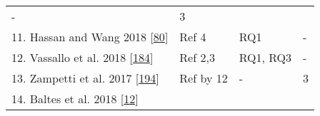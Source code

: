 \documentclass[]{book}
\begin{document}
\begin{longtable}[]{@{}llll@{}}
\begin{minipage}[t]{0.14\columnwidth}
-\strut
\end{minipage} & \begin{minipage}[t]{0.06\columnwidth}\raggedright\strut
3\strut
\end{minipage}\tabularnewline
\begin{minipage}[t]{0.48\columnwidth}\raggedright\strut
11. Hassan and Wang 2018
{[}\protect\hyperlink{ref-hassan2018hirebuild}{80}{]}\strut
\end{minipage} & \begin{minipage}[t]{0.20\columnwidth}\raggedright\strut
Ref 4\strut
\end{minipage} & \begin{minipage}[t]{0.14\columnwidth}\raggedright\strut
RQ1\strut
\end{minipage} & \begin{minipage}[t]{0.06\columnwidth}\raggedright\strut
-\strut
\end{minipage}\tabularnewline
\begin{minipage}[t]{0.48\columnwidth}\raggedright\strut
12. Vassallo et al. 2018
{[}\protect\hyperlink{ref-vassallo2018break}{184}{]}\strut
\end{minipage} & \begin{minipage}[t]{0.20\columnwidth}\raggedright\strut
Ref 2,3\strut
\end{minipage} & \begin{minipage}[t]{0.14\columnwidth}\raggedright\strut
RQ1, RQ3\strut
\end{minipage} & \begin{minipage}[t]{0.06\columnwidth}\raggedright\strut
-\strut
\end{minipage}\tabularnewline
\begin{minipage}[t]{0.48\columnwidth}\raggedright\strut
13. Zampetti et al. 2017
{[}\protect\hyperlink{ref-zampetti2017open}{194}{]}\strut
\end{minipage} & \begin{minipage}[t]{0.20\columnwidth}\raggedright\strut
Ref by 12\strut
\end{minipage} & \begin{minipage}[t]{0.14\columnwidth}\raggedright\strut
-\strut
\end{minipage} & \begin{minipage}[t]{0.06\columnwidth}\raggedright\strut
3\strut
\end{minipage}\tabularnewline
\begin{minipage}[t]{0.48\columnwidth}\raggedright\strut
14. Baltes et al. 2018
{[}\protect\hyperlink{ref-baltes2018no}{12}{]}\strut

\end{minipage}
\end{longtable}
\end{document}
